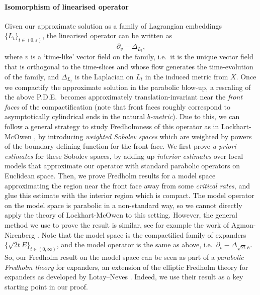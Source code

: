 \documentclass[10pt, a4paper]{article}
\theoremstyle{plain}%
\theoremstyle{definition}
\numberwithin{figure}{section}
\numberwithin{equation}{section}
\newcommand{\pa}{\partial}
\newcommand{\ep}{\varepsilon}
\begin{document}
\paragraph*{Isomorphism of linearised operator}
Given our approximate solution as a family of Lagrangian embeddings $\{L_t\}_{t\in(0,\ep)}$, the linearised operator can be written as \[
\pa_v-\Delta_{L_t},
\]
where $v$ is a `time-like' vector field on the family, i.e.\ it is the unique vector field that is orthogonal to the time-slices and whose flow generates the time-evolution of the family, and $\Delta_{L_t}$ is the Laplacian on $L_t$ in the induced metric from $X$. Once we compactify the approximate solution in the parabolic blow-up, a rescaling of the above P.D.E.\ becomes approximately translation-invariant near the \textit{front faces} of the compactification (note that front faces roughly correspond to asymptotically cylindrical ends in the natural \textit{$b$-metric}). Due to this, we can follow a general strategy to study Fredholmness of this operator as in Lockhart-McOwen \cite{LM85}, by introducing \textit{weighted Sobolev spaces} which are weighted by powers of the boundary-defining function for the front face. We first prove \textit{a-priori estimates} for these Sobolev spaces, by adding up \textit{interior estimates} over local models that approximate our operator with standard parabolic operators on Euclidean space. Then, we prove Fredholm results for a model space approximating the region near the front face away from some \textit{critical rates}, and glue this estimate with the interior region which is compact. The model operator on the model space is parabolic in a non-standard way, so we cannot directly apply the theory of Lockhart-McOwen to this setting. However, the general method we use to prove the result is similar, see for example the work of Agmon-Nirenberg \cite{AN63}. Note that the model space is the compactified family of expanders $\{\sqrt{2t}E\}_{t\in(0,\infty)}$, and the model operator is the same as above, i.e.\ $\pa_v-\Delta_{\sqrt{2t}E}$. So, our Fredholm result on the model space can be seen as part of a \textit{parabolic Fredholm theory} for expanders, an extension of the elliptic Fredholm theory for expanders as developed by Lotay--Neves \cite{LN13}. Indeed, we use their result as a key starting point in our proof.
\end{document}
